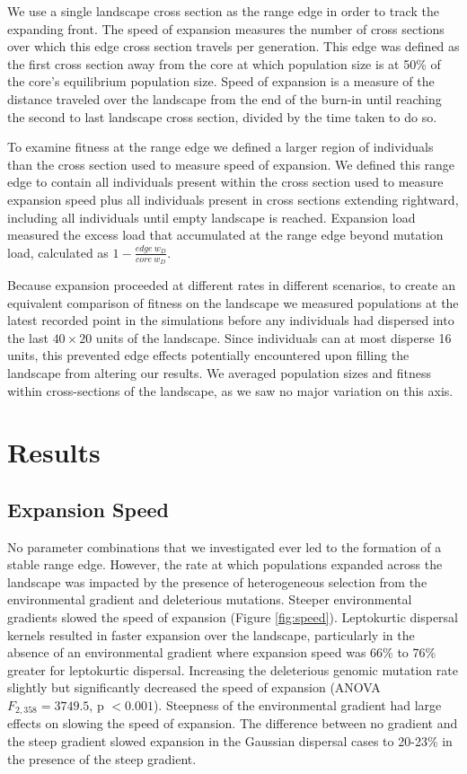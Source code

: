 We use a single landscape cross section as the range edge in order to track the expanding front. The speed of expansion measures the number of cross sections over which this edge cross section travels per generation. This edge was defined as the first cross section away from the core at which population size is at 50\% of the core's equilibrium population size. Speed of expansion is a measure of the distance traveled over the landscape from the end of the burn-in until reaching the second to last landscape cross section, divided by the time taken to do so.

To examine fitness at the range edge we defined a larger region of individuals than the cross section used to measure speed of expansion. We defined this range edge to contain all individuals present within the cross section used to measure expansion speed plus all individuals present in cross sections extending rightward, including all individuals until empty landscape is reached. Expansion load measured the excess load that accumulated at the range edge beyond mutation load, calculated as $1 - \frac{edge ~ w_D}{core ~ w_D}$.

Because expansion proceeded at different rates in different scenarios, to create an equivalent comparison of fitness on the landscape we measured populations at the latest recorded point in the simulations before any individuals had dispersed into the last $40\times20$ units of the landscape. Since individuals can at most disperse 16 units, this prevented edge effects potentially encountered upon filling the landscape from altering our results. We averaged population sizes and fitness within cross-sections of the landscape, as we saw no major variation on this axis. 


\section*{Results}

\subsection*{Expansion Speed}
No parameter combinations that we investigated ever led to the formation of a stable range edge. However, the rate at which populations expanded across the landscape was impacted by the presence of heterogeneous selection from the environmental gradient and deleterious mutations. Steeper environmental gradients slowed the speed of expansion (Figure \ref{fig:speed}). Leptokurtic dispersal kernels resulted in faster expansion over the landscape, particularly in the absence of an environmental gradient where expansion speed was 66\% to 76\% greater for leptokurtic dispersal. Increasing the deleterious genomic mutation rate slightly but significantly decreased the speed of expansion (ANOVA $F_{2,358} = 3749.5$,  p $< 0.001$). Steepness of the environmental gradient had large effects on slowing the speed of expansion. The difference between no gradient and the steep gradient slowed expansion in the Gaussian dispersal cases to 20-23\% in the presence of the steep gradient.

